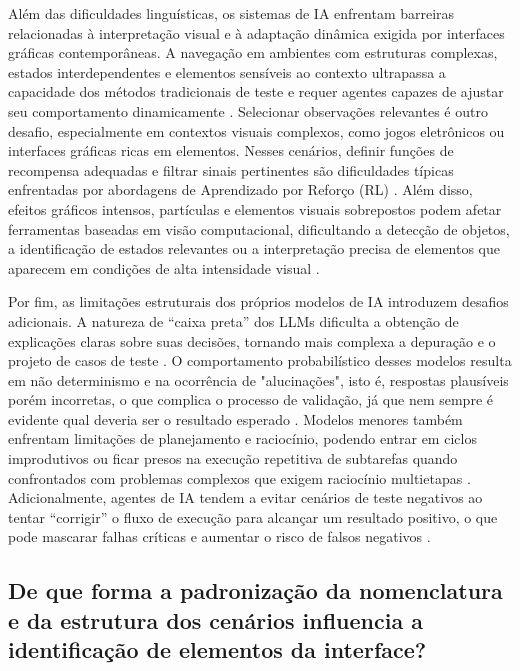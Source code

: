 Além das dificuldades linguísticas, os sistemas de IA enfrentam barreiras relacionadas à interpretação visual e à adaptação dinâmica exigida por interfaces gráficas contemporâneas. A navegação em ambientes com estruturas complexas, estados interdependentes e elementos sensíveis ao contexto ultrapassa a capacidade dos métodos tradicionais de teste e requer agentes capazes de ajustar seu comportamento dinamicamente \cite{Mughal2025}. Selecionar observações relevantes é outro desafio, especialmente em contextos visuais complexos, como jogos eletrônicos ou interfaces gráficas ricas em elementos. Nesses cenários, definir funções de recompensa adequadas e filtrar sinais pertinentes são dificuldades típicas enfrentadas por abordagens de Aprendizado por Reforço (RL) \cite{Mastain2024}. Além disso, efeitos gráficos intensos, partículas e elementos visuais sobrepostos podem afetar ferramentas baseadas em visão computacional, dificultando a detecção de objetos, a identificação de estados relevantes ou a interpretação precisa de elementos que aparecem em condições de alta intensidade visual \cite{Paduraru2022}.

Por fim, as limitações estruturais dos próprios modelos de IA introduzem desafios adicionais. A natureza de “caixa preta” dos LLMs dificulta a obtenção de explicações claras sobre suas decisões, tornando mais complexa a depuração e o projeto de casos de teste \cite{Pysmennyi2025}. O comportamento probabilístico desses modelos resulta em não determinismo e na ocorrência de "alucinações", isto é, respostas plausíveis porém incorretas, o que complica o processo de validação, já que nem sempre é evidente qual deveria ser o resultado esperado \cite{Freeman2025}. Modelos menores também enfrentam limitações de planejamento e raciocínio, podendo entrar em ciclos improdutivos ou ficar presos na execução repetitiva de subtarefas quando confrontados com problemas complexos que exigem raciocínio multietapas \cite{Pysmennyi2025}. Adicionalmente, agentes de IA tendem a evitar cenários de teste negativos ao tentar “corrigir” o fluxo de execução para alcançar um resultado positivo, o que pode mascarar falhas críticas e aumentar o risco de falsos negativos \cite{Pysmennyi2025}.

\subsection{De que forma a padronização da nomenclatura e da estrutura dos cenários influencia a identificação de elementos da interface?} 

